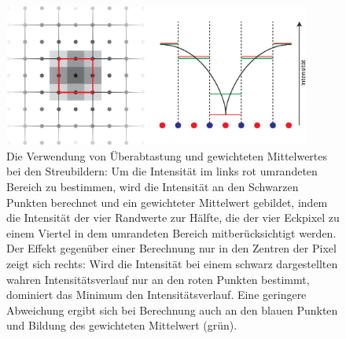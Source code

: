 \begin{figure} %
	\centering
	\includegraphics[width=0.9\textwidth]{images/average.eps}
	\caption[Gewichteter Mittelwert]{Die Verwendung von Überabtastung und gewichteten Mittelwertes bei den Streubildern: Um die Intensität im links rot umrandeten Bereich zu bestimmen, wird die Intensität an den Schwarzen Punkten berechnet und ein gewichteter Mittelwert gebildet, indem die Intensität der vier Randwerte zur Hälfte, die der vier Eckpixel zu einem Viertel in dem umrandeten Bereich mitberücksichtigt werden. Der Effekt gegenüber einer Berechnung nur in den Zentren der Pixel zeigt sich rechts: Wird die Intensität bei einem schwarz dargestellten wahren Intensitätsverlauf nur an den roten Punkten bestimmt, dominiert das Minimum den Intensitätsverlauf. Eine geringere Abweichung ergibt sich bei Berechnung auch an den blauen Punkten und Bildung des gewichteten Mittelwert (grün).}
	\label{fig:average}
\end{figure} 




